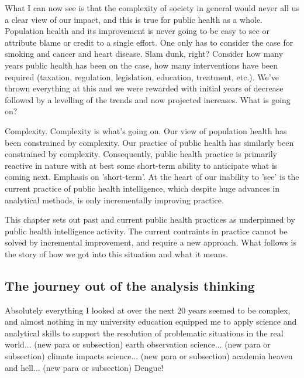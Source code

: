 What I can now see is that the complexity of society in general would never all us a clear view of our impact, and this is true for public health as a whole. Population health and its improvement is never going to be easy to see or attribute blame or credit to a single effort. One only has to consider the case for smoking and cancer and heart disease. Slam dunk, right? Consider how many years public health has been on the case, how many interventions have been required (taxation, regulation, legislation, education, treatment, etc.). We've thrown everything at this and we were rewarded with initial years of decrease followed by a levelling of the trends and now projected increases. What is going on?

Complexity. Complexity is what's going on. Our view of population health has been constrained by complexity. Our practice of public health has similarly been constrained by complexity. Consequently, public health practice is primarily reactive in nature with at best some short-term ability to anticipate what is coming next. Emphasis on 'short-term'. At the heart of our inability to 'see' is the current practice of public health intelligence, which despite huge advances in analytical methods, is only incrementally improving practice.

This chapter sets out past and current public health practices as underpinned by public health intelligence activity. The current contraints in practice cannot be solved by incremental improvement, and require a new approach. What follows is the story of how we got into this situation and what it means.


\subsection{The journey out of the analysis thinking}

Absolutely everything I looked at over the next 20 years seemed to be complex, and almost nothing in my university education equipped me to apply science and analytical skills to support the resolution of problematic situations in the real world... (new para or subsection) earth observation science... (new para or subsection) climate impacts science... (new para or subsection) academia heaven and hell... (new para or subsection) Dengue!
